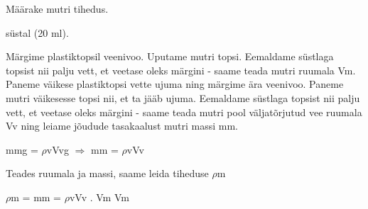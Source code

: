 
Määrake mutri tihedus.

süstal (20 ml).

\hint

\solu
Märgime plastiktopsil veenivoo. Uputame mutri topsi. Eemaldame süstlaga topsist nii palju vett, et veetase oleks märgini - saame teada mutri ruumala Vm. Paneme väikese plastiktopsi vette ujuma ning märgime ära veenivoo. Paneme mutri väikesesse topsi nii, et ta jääb ujuma. Eemaldame süstlaga topsist nii palju vett, et veetase oleks märgini - saame teada mutri pool väljatõrjutud vee ruumala Vv ning leiame jõudude tasakaalust mutri massi mm.

mmg = $\rho$vVvg $\Rightarrow$ mm = $\rho$vVv

Teades ruumala ja massi, saame leida tiheduse $\rho$m

$\rho$m = mm = $\rho$vVv . Vm Vm
\probend
